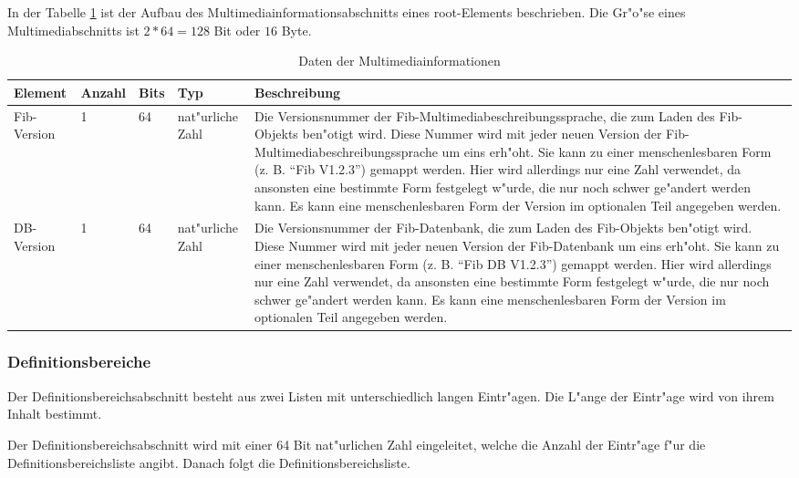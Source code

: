 In der Tabelle \ref{tableCompressedMultimediainfo} ist der Aufbau des Multimediainformationsabschnitts eines root-Elements beschrieben.
Die Gr"o"se eines Multimediabschnitts ist $2*64=128$ Bit oder $16$ Byte.

\begin{table}[htbp]
\begin{center}
\begin{tabular}{|p{20mm}|p{7mm}|p{7mm}|p{16mm}|p{70mm}|}\hline
	Element & An\-zahl & Bits & Typ & Beschreibung \\\hline\hline
	Fib-Version & 1 & 64 & nat"urliche Zahl & Die Versionsnummer der Fib-Multimediabeschreibungssprache, die zum Laden des Fib-Objekts ben"otigt wird. Diese Nummer wird mit jeder neuen Version der Fib-Multimediabeschreibungssprache um eins erh"oht. Sie kann zu einer menschenlesbaren Form (z. B. ``Fib V1.2.3'') gemappt werden. Hier wird allerdings nur eine Zahl verwendet, da ansonsten eine bestimmte Form festgelegt w"urde, die nur noch schwer ge"andert werden kann. Es kann eine menschenlesbaren Form der Version im optionalen Teil angegeben werden.\\\hline
	DB-Version & 1 & 64 & nat"urliche Zahl & Die Versionsnummer der Fib-Datenbank, die zum Laden des Fib-Objekts ben"otigt wird. Diese Nummer wird mit jeder neuen Version der Fib-Datenbank um eins erh"oht. Sie kann zu einer menschenlesbaren Form (z. B. ``Fib DB V1.2.3'') gemappt werden. Hier wird allerdings nur eine Zahl verwendet, da ansonsten eine bestimmte Form festgelegt w"urde, die nur noch schwer ge"andert werden kann. Es kann eine menschenlesbaren Form der Version im optionalen Teil angegeben werden.\\\hline
\end{tabular}
\end{center}
\caption{Daten der Multimediainformationen}
\label{tableCompressedMultimediainfo}
\end{table}


\subsubsection{Definitionsbereiche}
\label{secCompressedDefinitionranges}\label{secCompressedDomains}

Der Definitionsbereichsabschnitt besteht aus zwei Listen mit unterschiedlich langen Eintr"agen. Die L"ange der Eintr"age wird von ihrem Inhalt bestimmt.

Der Definitionsbereichsabschnitt wird mit einer 64 Bit nat"urlichen Zahl eingeleitet, welche die Anzahl der Eintr"age f"ur die Definitionsbereichsliste angibt. Danach folgt die Definitionsbereichsliste.

